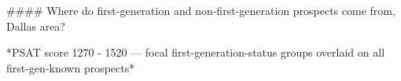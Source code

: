 #### Where do first-generation and non-first-generation prospects come from, Dallas area?

*PSAT score 1270 - 1520 — focal first-generation-status groups overlaid on all first-gen-known prospects*
